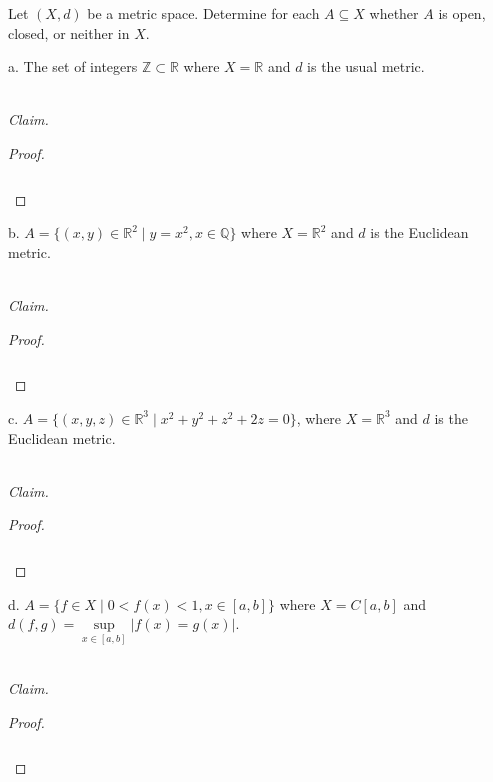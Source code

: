 Let $(X, d)$ be a metric space. Determine for each $A \subseteq X$ whether $A$ is open, closed, or neither in $X$.

a.  The set of integers $\mathbb{Z} \subset \mathbb{R}$ where $X = \mathbb{R}$ and $d$ is the usual metric.

\ \\
\emph{Claim.} 

\begin{proof}\renewcommand{\qedsymbol}{}\ \\\\
    \begin{align*}
    \end{align*}
\end{proof}

\pagebreak

b.  $A = \{(x, y) \in \mathbb{R}^2 \mid y=x^2, x \in \mathbb{Q} \}$ where $X = \mathbb{R}^2$ and $d$ is the Euclidean
     metric.

\ \\
\emph{Claim.} 

\begin{proof}\renewcommand{\qedsymbol}{}\ \\\\
    \begin{align*}
    \end{align*}
\end{proof}

\pagebreak

c.  $A = \{(x, y, z) \in \mathbb{R}^3 \mid x^2 + y^2 + z^2 + 2z = 0 \}$, where $X = \mathbb{R}^3$ and $d$ is the 
    Euclidean metric.

\ \\
\emph{Claim.} 

\begin{proof}\renewcommand{\qedsymbol}{}\ \\\\
    \begin{align*}
    \end{align*}
\end{proof}

\pagebreak

d.  $A = \{ f \in X \mid 0 < f(x) < 1, x \in [a, b] \}$ where $X = C[a, b]$ and 
    $d(f, g) = \sup\limits_{x \in [a, b]}{|f(x) = g(x)|}$. 

\ \\
\emph{Claim.} 

\begin{proof}\renewcommand{\qedsymbol}{}\ \\\\
    \begin{align*}
    \end{align*}
\end{proof}

